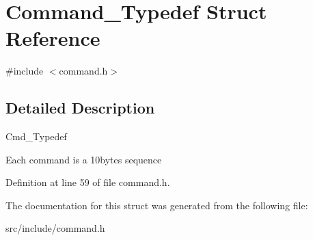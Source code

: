 \hypertarget{struct_command___typedef}{}\section{Command\+\_\+\+Typedef Struct Reference}
\label{struct_command___typedef}


{\ttfamily \#include $<$command.\+h$>$}



\subsection{Detailed Description}
Cmd\+\_\+\+Typedef

Each command is a 10bytes sequence 

Definition at line 59 of file command.\+h.



The documentation for this struct was generated from the following file\+:\begin{DoxyCompactItemize}
\item 
src/include/command.\+h\end{DoxyCompactItemize}
